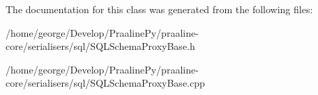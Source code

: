 The documentation for this class was generated from the following files\+:\begin{DoxyCompactItemize}
\item 
/home/george/\+Develop/\+Praaline\+Py/praaline-\/core/serialisers/sql/S\+Q\+L\+Schema\+Proxy\+Base.\+h\item 
/home/george/\+Develop/\+Praaline\+Py/praaline-\/core/serialisers/sql/S\+Q\+L\+Schema\+Proxy\+Base.\+cpp\end{DoxyCompactItemize}
